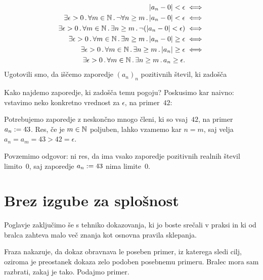 \begin{zgled}
\begin{align*}
          |a_n - 0| < \epsilon &\iff
    \\
    \exists \epsilon > 0 \,.\, \forall m \in \mathbb{N} \,.\, \lnot \forall n \geq m \,.\,
          |a_n - 0| < \epsilon &\iff
    \\
    \exists \epsilon > 0 \,.\, \forall m \in \mathbb{N} \,.\, \exists n \geq m \,.\,
          \lnot (|a_n - 0| < \epsilon) &\iff
    \\
    \exists \epsilon > 0 \,.\, \forall m \in \mathbb{N} \,.\, \exists n \geq m \,.\,
          |a_n - 0| \geq \epsilon &\iff
    \\
    \exists \epsilon > 0 \,.\, \forall m \in \mathbb{N} \,.\, \exists n \geq m \,.\,
          |a_n| \geq \epsilon &\iff
    \\
    \exists \epsilon > 0 \,.\, \forall m \in \mathbb{N} \,.\, \exists n \geq m \,.\,
          a_n \geq \epsilon.
  \end{align*}
  Ugotovili smo, da iščemo zaporedje $(a_n)_n$ pozitivnih števil, ki zadošča
  \begin{quote}
  \end{quote}
  Kako najdemo zaporedje, ki zadošča temu pogoju?
  Poskusimo kar naivno: vstavimo neko konkretno vrednost za $\epsilon$, na primer~$42$:
  \begin{quote}
  \end{quote}
  Potrebujemo zaporedje z neskončno mnogo členi, ki so vsaj~$42$, na primer $a_n \mathrel{{:}{=}} 43$.
  Res, če je $m \in \mathbb{N}$ poljuben, lahko vzamemo kar $n = m$, saj velja $a_n = a_m = 43 > 42 = \epsilon$.

  Povzemimo odgovor: ni res, da ima vsako zaporedje pozitivnih realnih števil limito~$0$, saj zaporedje $a_n \mathrel{{:}{=}} 43$ nima limite~$0$.
\end{zgled}


\section{Brez izgube za splošnost}

Poglavje zaključimo še s tehniko dokazovanja, ki jo boste srečali v praksi in ki od bralca zahteva malo več znanja kot osnovna pravila sklepanja.

Fraza  nakazuje, da dokaz obravnava le poseben primer, iz katerega sledi cilj, oziroma je preostanek dokaza zelo podoben posebnemu primeru. Bralec mora sam razbrati, zakaj je tako.
Podajmo primer.

